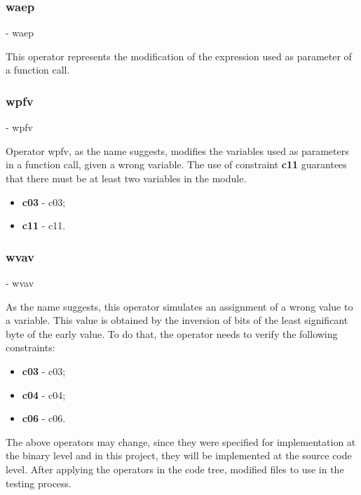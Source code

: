 	\subsubsection{\textbf{\acs{waep}}} - \Acl{waep}

	This operator represents the modification of the expression used as parameter of a function call.


	\subsubsection{\textbf{\acs{wpfv}}} - \Acl{wpfv}

	Operator \ac{wpfv}, as the name suggests, modifies the variables used as parameters in a function call, given a wrong variable. The use of constraint \textbf{\acs{c11}} guarantees that there must be at least two variables in the module.

	\begin{itemize}
		\item \textbf{\acs{c03}} - \Acl{c03};
		\item \textbf{\acs{c11}} - \Acl{c11}.
	\end{itemize}

	\subsubsection{\textbf{\acs{wvav}}} - \Acl{wvav}

	As the name suggests, this operator simulates an assignment of a wrong value to a variable. This value is obtained by the inversion of bits of the least significant byte of the early value. To do that, the operator needs to verify the following constraints:

	\begin{itemize}
		\item \textbf{\acs{c03}} - \Acl{c03};
		\item \textbf{\acs{c04}} - \Acl{c04};
		\item \textbf{\acs{c06}} - \Acl{c06}.
	\end{itemize}

The above operators may change, since they were specified for implementation at the binary level and in this project, they will be implemented at the source code level.
After applying the operators in the code tree, modified files to use in the testing process.

